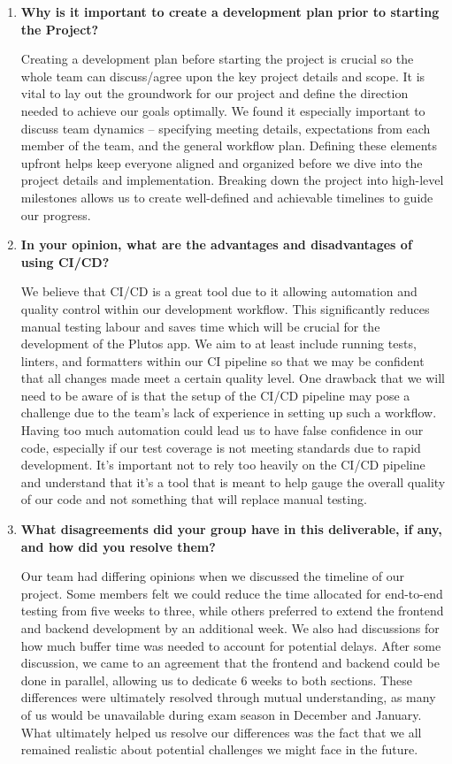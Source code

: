 \begin {enumerate}
\item \textbf{Why is it important to create a development plan prior to starting the
Project?}

Creating a development plan before starting the project is crucial so the whole team can discuss/agree upon the key project details and scope. It is vital to lay out the groundwork for our project and define the direction needed to achieve our goals optimally. We found it especially important to discuss team dynamics – specifying meeting details, expectations from each member of the team, and the general workflow plan. Defining these elements upfront helps keep everyone aligned and organized before we dive into the project details and implementation. Breaking down the project into high-level milestones allows us to create well-defined and achievable timelines to guide our progress.

\item \textbf{In your opinion, what are the advantages and disadvantages of using CI/CD?}

We believe that CI/CD is a great tool due to it allowing automation and quality control within our development workflow. This significantly reduces manual testing labour and saves time which will be crucial for the development of the Plutos app. We aim to at least include running tests, linters, and formatters within our CI pipeline so that we may be confident that all changes made meet a certain quality level. One drawback that we will need to be aware of is that the setup of the CI/CD pipeline may pose a challenge due to the team’s lack of experience in setting up such a workflow. Having too much automation could lead us to have false confidence in our code, especially if our test coverage is not meeting standards due to rapid development. It’s important not to rely too heavily on the CI/CD pipeline and understand that it’s a tool that is meant to help gauge the overall quality of our code and not something that will replace manual testing.

\item \textbf{What disagreements did your group have in this deliverable, if any, and how did you resolve them?}

Our team had differing opinions when we discussed the timeline of our project. Some members felt we could reduce the time allocated for end-to-end testing from five weeks to three, while others preferred to extend the frontend and backend development by an additional week. We also had discussions for how much buffer time was needed to account for potential delays. After some discussion, we came to an agreement that the frontend and backend could be done in parallel, allowing us to dedicate 6 weeks to both sections. These differences were ultimately resolved through mutual understanding, as many of us would be unavailable during exam season in December and January. What ultimately helped us resolve our differences was the fact that we all remained realistic about potential challenges we might face in the future.

\end{enumerate}